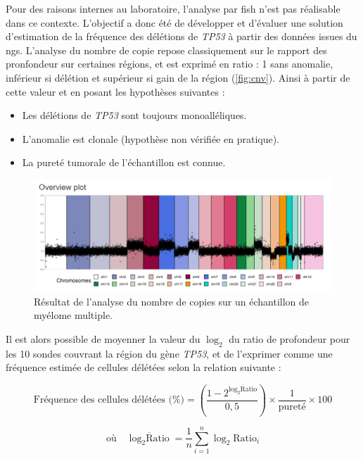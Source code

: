 Pour des raisons internes au laboratoire, l'analyse par \gls{fish} n'est pas réalisable dans ce contexte.  
L'objectif a donc été de développer et d'évaluer une solution d'estimation de la fréquence des délétions de \textit{TP53} à partir des données issues du \gls{ngs}. 
L'analyse du nombre de copie repose classiquement sur le rapport des pronfondeur sur certaines régions, et est exprimé en ratio : 1 sans anomalie, inférieur si délétion 
et supérieur si gain de la région (\autoref{fig:cnv}). Ainsi à partir de cette valeur et en posant les hypothèses suivantes :

\begin{itemize}
    \item Les délétions de \textit{TP53} sont toujours monoalléliques.
    \item L'anomalie est clonale (hypothèse non vérifiée en pratique).
    \item La pureté tumorale de l'échantillon est connue.
\end{itemize}

\begin{figure}[H]
    \centering
    \includegraphics[width=1\textwidth]{images/cnv.png}
    \caption{Résultat de l'analyse du nombre de copies sur un échantillon de myélome multiple.}
    \label{fig:cnv}
\end{figure}

Il est alors possible de moyenner la valeur du $\log_2$ du ratio de profondeur pour les 10 sondes couvrant la région du gène \textit{TP53},  
et de l'exprimer comme une fréquence estimée de cellules délétées selon la relation suivante :

\begin{equation}
    \text{Fréquence des cellules délétées (\%)} = \left( \frac{1 -2^{\overline{\log_2\text{Ratio}}}}{0{,}5} \right) 
    \times \frac{1}{\text{pureté}} \times 100
\end{equation}

\begin{equation}
    \text{où} \quad \overline{\log_2\text{Ratio}} = \frac{1}{n} \sum_{i=1}^{n} \log_2\text{Ratio}_i
\end{equation}
    

